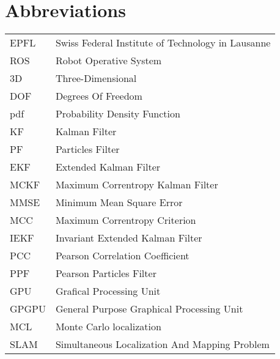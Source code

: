 \section{Abbreviations}
\begin{flushleft}
\begin{tabular}{l l}
EPFL & Swiss Federal Institute of Technology in Lausanne\\
ROS & Robot Operative System\\
3D & Three-Dimensional\\
DOF & Degrees Of Freedom\\
pdf & Probability Density Function\\
KF & Kalman Filter\\
PF & Particles Filter\\
EKF & Extended Kalman Filter\\
MCKF & Maximum Correntropy Kalman Filter\\
MMSE & Minimum Mean Square Error\\
MCC & Maximum Correntropy Criterion\\
IEKF & Invariant Extended Kalman Filter\\
PCC & Pearson Correlation Coefficient\\
PPF & Pearson Particles Filter\\
GPU & Grafical Processing Unit\\
GPGPU & General Purpose Graphical Processing Unit\\
MCL & Monte Carlo localization\\
SLAM & Simultaneous Localization And Mapping Problem\\
\end{tabular}
\end{flushleft}

